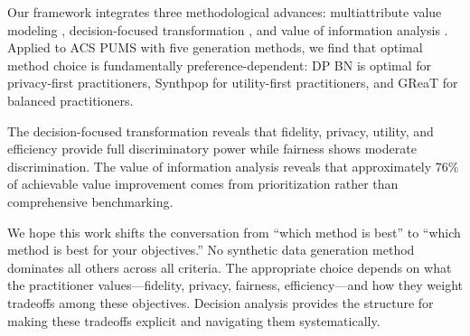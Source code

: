 \documentclass[12pt,a4paper]{article}
\begin{document}
Our framework integrates three methodological advances: multiattribute value modeling \citep{butler2005plutonium}, decision-focused transformation \citep{dees2010decision}, and value of information analysis \citep{keisler2004value}. Applied to ACS PUMS with five generation methods, we find that optimal method choice is fundamentally preference-dependent: DP BN is optimal for privacy-first practitioners, Synthpop for utility-first practitioners, and GReaT for balanced practitioners.

The decision-focused transformation reveals that fidelity, privacy, utility, and efficiency provide full discriminatory power while fairness shows moderate discrimination. The value of information analysis reveals that approximately 76\% of achievable value improvement comes from prioritization rather than comprehensive benchmarking.

We hope this work shifts the conversation from ``which method is best'' to ``which method is best for your objectives.'' No synthetic data generation method dominates all others across all criteria. The appropriate choice depends on what the practitioner values---fidelity, privacy, fairness, efficiency---and how they weight tradeoffs among these objectives. Decision analysis provides the structure for making these tradeoffs explicit and navigating them systematically.

\newpage

\end{document}
